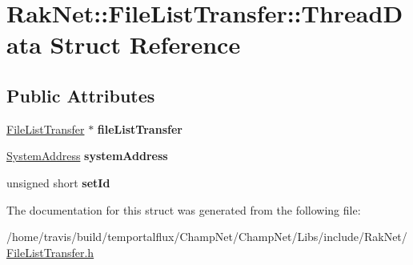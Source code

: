\hypertarget{struct_rak_net_1_1_file_list_transfer_1_1_thread_data}{\section{Rak\-Net\-:\-:File\-List\-Transfer\-:\-:Thread\-Data Struct Reference}
\label{struct_rak_net_1_1_file_list_transfer_1_1_thread_data}
}
\subsection*{Public Attributes}
\begin{DoxyCompactItemize}
\item 
\hypertarget{struct_rak_net_1_1_file_list_transfer_1_1_thread_data_a1f5e3b77d156118d9e29e7a6bed9342c}{\hyperlink{class_rak_net_1_1_file_list_transfer}{File\-List\-Transfer} $\ast$ {\bfseries file\-List\-Transfer}}\label{struct_rak_net_1_1_file_list_transfer_1_1_thread_data_a1f5e3b77d156118d9e29e7a6bed9342c}

\item 
\hypertarget{struct_rak_net_1_1_file_list_transfer_1_1_thread_data_a267512e3f61237dc6304251f91ce0ac0}{\hyperlink{struct_rak_net_1_1_system_address}{System\-Address} {\bfseries system\-Address}}\label{struct_rak_net_1_1_file_list_transfer_1_1_thread_data_a267512e3f61237dc6304251f91ce0ac0}

\item 
\hypertarget{struct_rak_net_1_1_file_list_transfer_1_1_thread_data_a0024145e399e4c6982d7c8aacf368740}{unsigned short {\bfseries set\-Id}}\label{struct_rak_net_1_1_file_list_transfer_1_1_thread_data_a0024145e399e4c6982d7c8aacf368740}

\end{DoxyCompactItemize}


The documentation for this struct was generated from the following file\-:\begin{DoxyCompactItemize}
\item 
/home/travis/build/temportalflux/\-Champ\-Net/\-Champ\-Net/\-Libs/include/\-Rak\-Net/\hyperlink{_file_list_transfer_8h}{File\-List\-Transfer.\-h}\end{DoxyCompactItemize}
